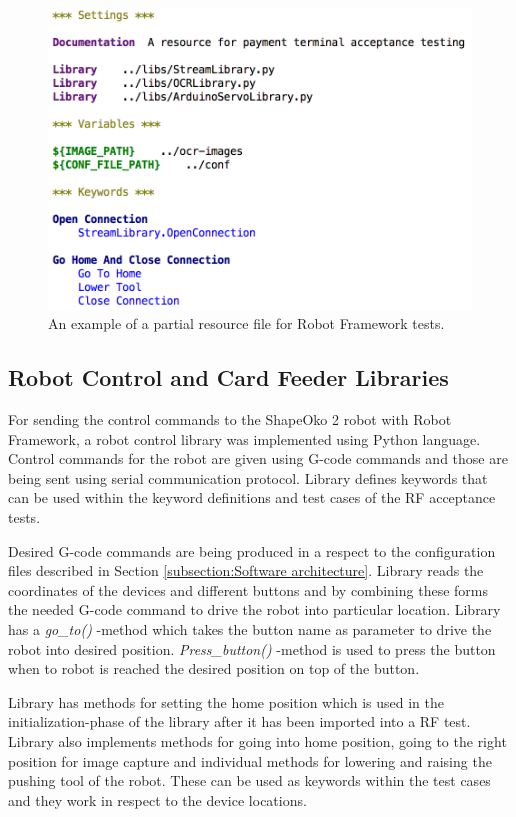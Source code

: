 \begin{figure}[ht]
  \begin{center}
    \includegraphics[width=12cm]{images/resource.png}
    \caption{An example of a partial resource file for Robot Framework tests.}
    \label{fig:resource}
  \end{center}
\end{figure}
\FloatBarrier

\subsection{Robot Control and Card Feeder Libraries}
\label{subsection:libraries}

For sending the control commands to the ShapeOko 2 robot with Robot Framework, a robot control library was implemented using Python language. Control commands for the robot are given using G-code commands and those are being sent using serial communication protocol. Library defines keywords that can be used within the keyword definitions and test cases of the RF acceptance tests.

Desired G-code commands are being produced in a respect to the configuration files described in Section \ref{subsection:Software architecture}. Library reads the coordinates of the devices and different buttons and by combining these forms the needed G-code command to drive the robot into particular location. Library has a \emph{go\_to()} -method which takes the button name as parameter to drive the robot into desired position. \emph{Press\_button()} -method is used to press the button when to robot is reached the desired position on top of the button.

Library has methods for setting the home position which is used in the initialization-phase of the library after it has been imported into a RF test. Library also implements methods for going into home position, going to the right position for image capture and individual methods for lowering and raising the pushing tool of the robot. These can be used as keywords within the test cases and they work in respect to the device locations.

